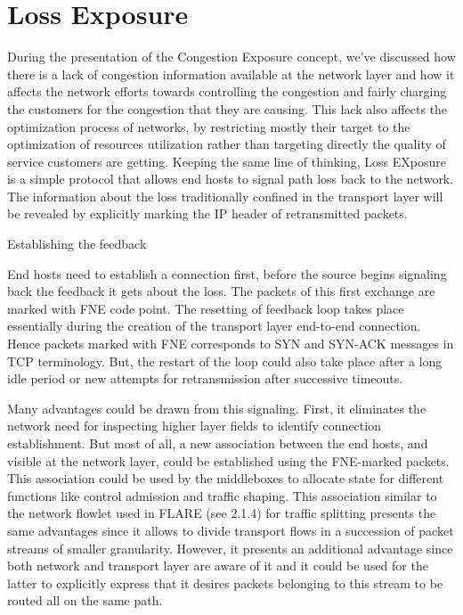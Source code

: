 
\section{Loss Exposure}

During the presentation of the Congestion Exposure concept, we've discussed how there is a lack of congestion information available at the network layer and how it affects the network efforts towards controlling the congestion and fairly charging the customers for the congestion that they are causing. This lack also affects the optimization process of networks, by restricting mostly their target to the optimization of resources utilization rather than targeting directly the quality of service customers are getting. Keeping the same line of thinking, Loss EXposure is a simple protocol that allows end hosts to signal path loss back to the network. The information about the loss traditionally confined in the transport layer will be revealed by explicitly marking the IP header of retransmitted  packets.

Establishing the feedback

End hosts need to establish a connection first, before the source begins signaling back the feedback it gets about the loss. The packets of this first exchange are marked with FNE code point. The resetting of  feedback loop takes place essentially during the creation of the transport layer end-to-end connection.  Hence packets marked with FNE corresponds to SYN and SYN-ACK messages in TCP terminology. But, the restart of the loop could also take place after a long idle period or new attempts for retransmission after successive timeouts.

Many advantages could be drawn from this signaling. First, it eliminates the network need for inspecting higher layer fields to identify connection establishment. But most of all, a new  association between the end hosts, and visible at the network layer, could be established using the FNE-marked packets. This association could be used by the middleboxes to allocate state for different functions like control admission and traffic shaping. This association similar to the network flowlet used in FLARE (see 2.1.4) for traffic splitting presents the same advantages since it allows to divide transport flows in a succession of packet streams of smaller granularity. However, it presents an additional advantage since both network and transport layer are aware of it and it could be used for the latter to explicitly express that it desires packets belonging to this stream to be routed all on the same path.

